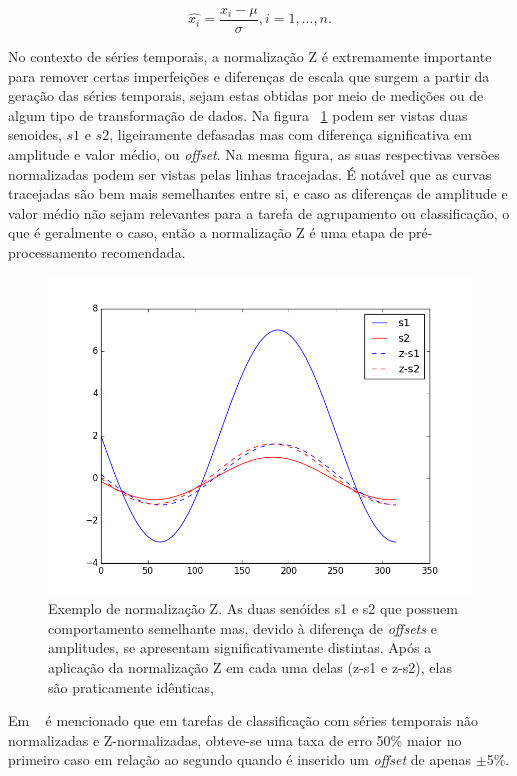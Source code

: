 \begin{equation}
\hat{x_i} = \frac{x_i - \mu}{\sigma}, i = 1,...,n.
\end{equation}

No contexto de séries temporais, a normalização Z é extremamente importante para remover certas imperfeições e diferenças de escala que surgem a partir da geração das séries temporais, sejam estas obtidas por meio de medições ou de algum tipo de transformação de dados. Na figura ~\ref{fig:z_norm} podem ser vistas duas senoides, $s1$ e $s2$, ligeiramente defasadas mas com diferença significativa em amplitude e valor médio, ou \emph{offset}. Na mesma figura, as suas respectivas versões normalizadas podem ser vistas pelas linhas tracejadas. É notável que as curvas tracejadas são bem mais semelhantes entre si, e caso as diferenças de amplitude e valor médio não sejam relevantes para a tarefa de agrupamento ou classificação, o que é geralmente o caso, então a normalização Z é uma etapa de pré-processamento recomendada.
\begin{figure}[h!]
	\includegraphics[width=\linewidth]{figuras/z_norm.png}
	\caption{Exemplo de normalização Z. As duas senóides s1 e s2 que possuem comportamento semelhante mas, devido à diferença de \emph{offsets} e  amplitudes, se apresentam significativamente distintas. Após a aplicação da normalização Z em cada uma delas (z-s1 e z-s2), elas são praticamente idênticas, }
	\label{fig:z_norm}
\end{figure}
 Em ~\parencite{trillions} é mencionado que em tarefas de classificação com séries temporais não normalizadas e Z-normalizadas, obteve-se uma taxa de erro 50\% maior no primeiro caso em relação ao segundo quando é inserido um \emph{offset} de apenas $\pm$5\%.
 
